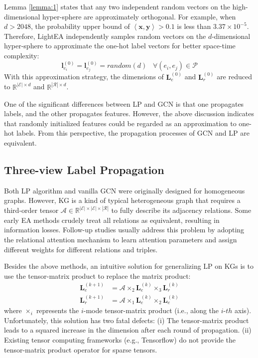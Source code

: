 \documentclass[11pt]{article}
\begin{document}
Lemma \ref{lemma:1} \cite{Ball1997AnEI} states that any two independent random vectors on the high-dimensional hyper-sphere are approximately orthogonal.
For example, when $d>2048$, the probability upper bound of $\left\langle\bm x,\bm y\right\rangle > 0.1$ is less than $3.37\times 10^{-5}$.
Therefore, LightEA independently samples random vectors on the $d$-dimensional hyper-sphere to approximate the one-hot label vectors for better space-time complexity:
\begin{equation}
    \bm l^{(0)}_{e_i}=\bm l^{(0)}_{e_j}=random(d)\;\;\;\forall(e_i,e_j)\in \mathcal{P}
\end{equation}
With this approximation strategy, the dimensions of $\bm L^{(0)}_e $ and $\bm L^{(0)}_r$ are reduced to $\mathbb{R}^{|\mathcal{E}|\times d}$ and $\mathbb{R}^{|\mathcal{R}|\times d}$.

One of the significant differences between LP and GCN is that one propagates labels, and the other propagates features.
However, the above discussion indicates that randomly initialized features could be regarded as an approximation to one-hot labels.
From this perspective, the propagation processes of GCN and LP are equivalent.

\subsection{Three-view Label Propagation}
Both LP algorithm and vanilla GCN were originally designed for homogeneous graphs.
However, KG is a kind of typical heterogeneous graph that requires a third-order tensor $\boldsymbol{\mathcal{A}}\in \mathbb{R}^{|\mathcal{E}|\times|\mathcal{E}|\times|\mathcal{R}|}$ to fully describe its adjacency relations.
Some early EA methods \cite{DBLP:conf/emnlp/WangLLZ18,DBLP:conf/acl/XuWYFSWY19} crudely treat all relations as equivalent, resulting in information losses.
Follow-up studies usually address this problem by adopting the relational attention mechanism \cite{DBLP:conf/ijcai/WuLF0Y019,DBLP:conf/wsdm/MaoWXLW20} to learn attention parameters and assign different weights for different relations and triples.

Besides the above methods, an intuitive solution for generalizing LP on KGs is to use the tensor-matrix product to replace the matrix product:
\begin{align}
  \bm L^{(k+1)}_e &= \boldsymbol{\mathcal{A}} \times_2 \bm L^{(k)}_e \times_3 \bm L^{(k)}_r\\
  \bm L^{(k+1)}_r &= \boldsymbol{\mathcal{A}} \times_1 \bm L^{(k)}_e \times_2 \bm L^{(k)}_e
\end{align}
where $\times_i$ represents the $i$-mode tensor-matrix product (i.e., along the $i$-$th$ axis).
Unfortunately, this solution has two fatal defects:
(i) The tensor-matrix product leads to a squared increase in the dimension after each round of propagation.
(ii) Existing tensor computing frameworks (e.g., Tensorflow) do not provide the tensor-matrix product operator for sparse tensors.
\end{document}
